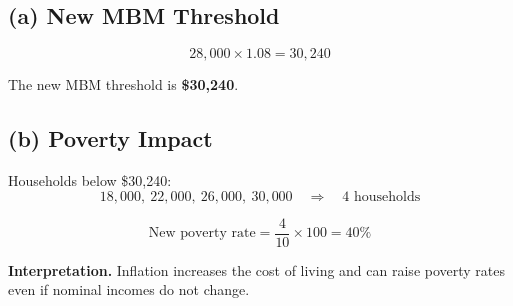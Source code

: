 \documentclass[11pt]{article}
\begin{document}
\subsection*{(a) New MBM Threshold}

\[
28{,}000 \times 1.08 = 30{,}240
\]

The new MBM threshold is \textbf{\$30,240}.

\subsection*{(b) Poverty Impact}

Households below \$30,240:
\[
18{,}000,\ 22{,}000,\ 26{,}000,\ 30{,}000 \quad \Rightarrow \quad 4 \text{ households}
\]

\[
\text{New poverty rate}=\frac{4}{10}\times 100=40\%
\]

\textbf{Interpretation.}  
Inflation increases the cost of living and can raise poverty rates even if nominal incomes do not change.
\end{document}

